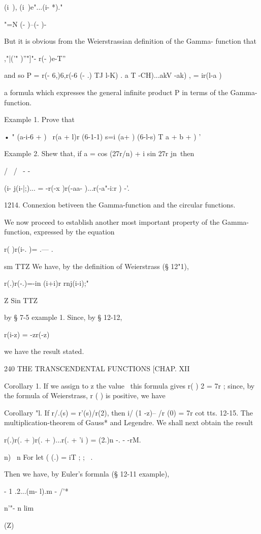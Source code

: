 (i\ ), (i\ )e"...(i- *)."

"=N (- )--(- )-

But it is obvious from the Weierstrassian definition of the Gamma-
function that

,"|('" )''"]"- r(- )e-T''

and so P = r(- 6,)6,r(-6 (- .) TJ l-K) . a T -CH)...akV -ak) , =
ir(l-a )

a formula which expresses the general infinite product P in terms of
the Gamma-function.

Example 1. Prove that

• " (a-i-6 + ) \ r(a + l)r (6-1-1) s=i (a+ ) (6-l-s) T a + b + ) '

Example 2. Shew that, if a = cos (27r/n) + i sin 27r jn\ then

/ \ / \ - -

 (i- j(i-|;)... = -r(-x )r(-aa- )...r(-a"-i:r ) -'.

1214. Connexion betiveen the Gamma-function and the circular
functions.

We now proceed to establish another most important property of the
Gamma-function, expressed by the equation

r( )r(i-. )= .— .

sm TTZ We have, by the definition of Weierstrass (§ 12"1),

r(.)r(-.)=-in (i+i)r rnj(i-i);"

Z Sin TTZ

by § 7-5 example 1. Since, by § 12-12,

r(i-z) = -zr(-z)

we have the result stated.

240 THE TRANSCENDENTAL FUNCTIONS [CHAP. XII

Corollary 1. If we assign to z the value \, this formula gives r( ) 2
= 7r ; since, by the formula of Weierstrass, r ( ) is positive, we
have

Corollary "l. If r/.(s) = r'(s)/r(2), then i/ (1 -z)-- /r (0) = 7r cot
tts. 12-15. The multiplication-theorem of Gauss* and Legendre. We
shall next obtain the result

r(.)r(. + )r(. + )...r(. + 'i ) = (2.)n -. - -rM.

n) \ n For let ( (.) = iT ; ; \ .

Then we have, by Euler's formnla (§ 12-11 example),

 - 1 .2...(m- l).m - /'*

n'"- n lim

 (Z)

